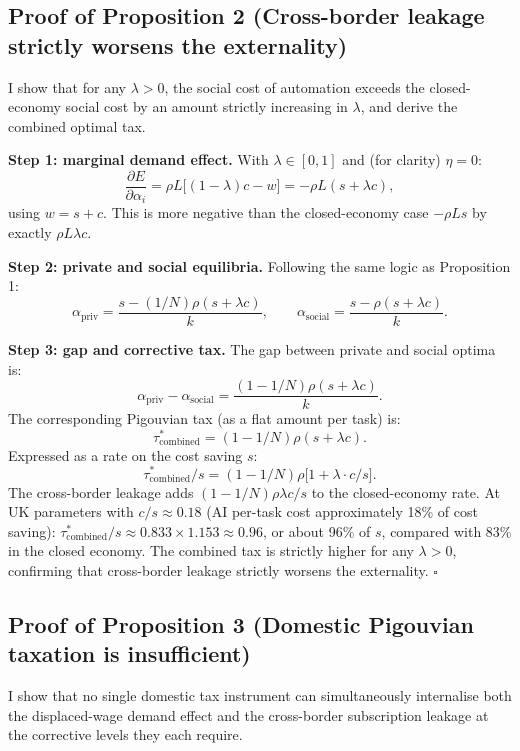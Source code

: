 \documentclass[11pt,letterpaper]{article}
\theoremstyle{remark}
\begin{document}
\subsection*{Proof of Proposition 2 (Cross-border leakage strictly worsens the externality)}

I show that for any $\lambda > 0$, the social cost of automation exceeds the closed-economy social cost by an amount strictly increasing in $\lambda$, and derive the combined optimal tax.

\textbf{Step 1: marginal demand effect.} With $\lambda \in [0,1]$ and (for clarity) $\eta = 0$:
\[
\frac{\partial E}{\partial \alpha_i} = \rho L \big[(1-\lambda) c - w\big] = -\rho L (s + \lambda c),
\]
using $w = s + c$. This is more negative than the closed-economy case $-\rho L s$ by exactly $\rho L \lambda c$.

\textbf{Step 2: private and social equilibria.} Following the same logic as Proposition 1:
\[
\alpha_{\text{priv}} = \frac{s - (1/N) \rho (s + \lambda c)}{k}, \qquad \alpha_{\text{social}} = \frac{s - \rho (s + \lambda c)}{k}.
\]

\textbf{Step 3: gap and corrective tax.} The gap between private and social optima is:
\[
\alpha_{\text{priv}} - \alpha_{\text{social}} = \frac{(1 - 1/N) \rho (s + \lambda c)}{k}.
\]
The corresponding Pigouvian tax (as a flat amount per task) is:
\[
\tau^*_{\text{combined}} = (1 - 1/N) \rho (s + \lambda c).
\]
Expressed as a rate on the cost saving $s$:
\[
\boxed{\tau^*_{\text{combined}}/s = (1 - 1/N) \rho \big[1 + \lambda \cdot c/s\big].}
\]
The cross-border leakage adds $(1 - 1/N) \rho \lambda c/s$ to the closed-economy rate. At UK parameters with $c/s \approx 0.18$ (AI per-task cost approximately 18\% of cost saving): $\tau^*_{\text{combined}}/s \approx 0.833 \times 1.153 \approx 0.96$, or about 96\% of $s$, compared with 83\% in the closed economy. The combined tax is strictly higher for any $\lambda > 0$, confirming that cross-border leakage strictly worsens the externality. \hfill$\square$

\subsection*{Proof of Proposition 3 (Domestic Pigouvian taxation is insufficient)}

I show that no single domestic tax instrument can simultaneously internalise both the displaced-wage demand effect and the cross-border subscription leakage at the corrective levels they each require.
\end{document}
